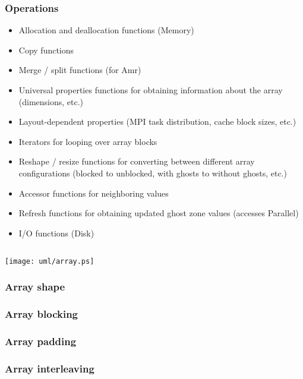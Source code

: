 \subsubsection{Operations}

\begin{itemize}
\item Allocation and deallocation functions (Memory)
\item Copy functions
\item Merge / split functions (for Amr)
\item Universal properties functions for obtaining information about
  the array (dimensions, etc.)
\item Layout-dependent properties (MPI task distribution, cache block
  sizes, etc.)
\item Iterators for looping over array blocks
\item Reshape / resize functions for converting between different
  array configurations (blocked to unblocked, with ghosts to without
  ghosts, etc.)
\item Accessor functions for neighboring values
\item Refresh functions for obtaining updated ghost zone values
  (accesses Parallel)
\item I/O functions (Disk)
\end{itemize}

\subsection{}

\centerline{\texttt{[image: uml/array.ps]}}

\subsubsection{Array shape}

\subsubsection{Array blocking}

\subsubsection{Array padding}

\subsubsection{Array interleaving}


